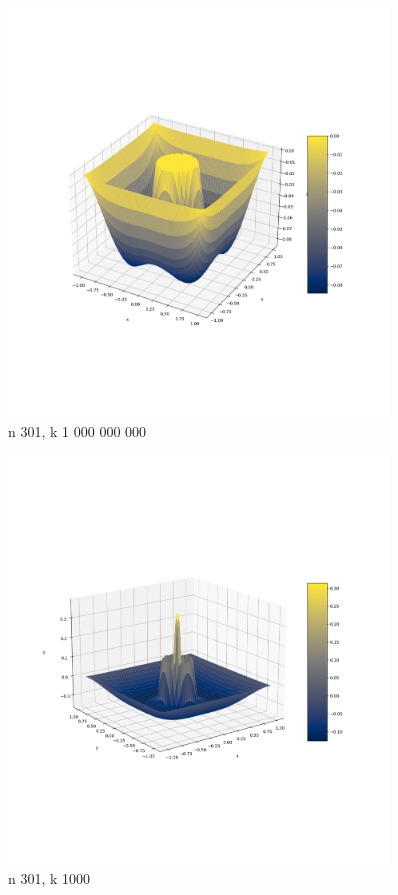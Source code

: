 \documentclass{article}
\begin{document}
    \begin{figure}[h]
        \centering
        \includegraphics[width=0.9\textwidth]{nal1_n301_k1e9.png}
        \caption{n 301, k 1 000 000 000}
    \end{figure}

    \begin{figure}[h]
        \centering
        \includegraphics[width=0.9\textwidth]{nal1_n301_k1000.png}
        \caption{n 301, k 1000}
    \end{figure}
\end{document}
